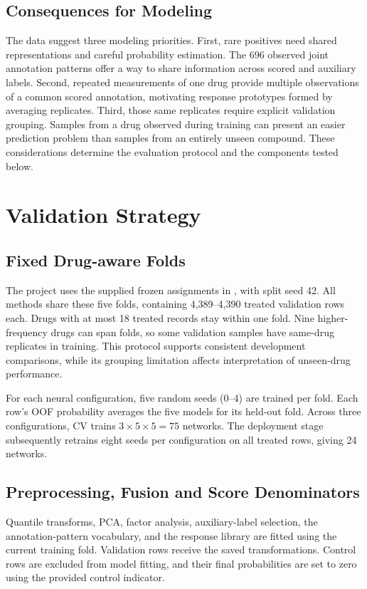 \documentclass[journal]{IEEEtran}
\begin{document}
\subsection{Consequences for Modeling}
The data suggest three modeling priorities. First, rare positives need shared representations and careful probability estimation. The 696 observed joint annotation patterns offer a way to share information across scored and auxiliary labels. Second, repeated measurements of one drug provide multiple observations of a common scored annotation, motivating response prototypes formed by averaging replicates. Third, those same replicates require explicit validation grouping. Samples from a drug observed during training can present an easier prediction problem than samples from an entirely unseen compound. These considerations determine the evaluation protocol and the components tested below.

\section{Validation Strategy}
\label{sec:validation}

\subsection{Fixed Drug-aware Folds}
The project uses the supplied frozen assignments in , with split seed 42. All methods share these five folds, containing 4,389--4,390 treated validation rows each. Drugs with at most 18 treated records stay within one fold. Nine higher-frequency drugs can span folds, so some validation samples have same-drug replicates in training. This protocol supports consistent development comparisons, while its grouping limitation affects interpretation of unseen-drug performance.

For each neural configuration, five random seeds (0--4) are trained per fold. Each row's OOF probability averages the five models for its held-out fold. Across three configurations, CV trains $3\times5\times5=75$ networks. The deployment stage subsequently retrains eight seeds per configuration on all treated rows, giving 24 networks.

\subsection{Preprocessing, Fusion and Score Denominators}
Quantile transforms, PCA, factor analysis, auxiliary-label selection, the annotation-pattern vocabulary, and the response library are fitted using the current training fold. Validation rows receive the saved transformations. Control rows are excluded from model fitting, and their final probabilities are set to zero using the provided control indicator.
\end{document}
